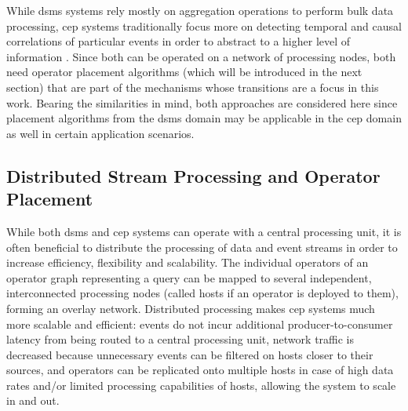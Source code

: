 While \gls{dsms} systems rely mostly on aggregation operations to perform bulk data processing, \gls{cep} systems traditionally focus more on detecting temporal and causal correlations of particular events in order to abstract to a higher level of information \cite{Cugola2012}. Since both can be operated on a network of processing nodes, both need operator placement algorithms (which will be introduced in the next section) that are part of the mechanisms whose transitions are a focus in this work. Bearing the similarities in mind, both approaches are considered here since placement algorithms from the \gls{dsms} domain may be applicable in the \gls{cep} domain as well in certain application scenarios.

\subsection{Distributed Stream Processing and Operator Placement}

While both \gls{dsms} and \gls{cep} systems can operate with a central processing unit, it is often beneficial to distribute the processing of data and event streams in order to increase efficiency, flexibility and scalability.   
The individual operators of an operator graph representing a query can be mapped to several independent, interconnected processing nodes (called hosts if an operator is deployed to them), forming an overlay network. Distributed processing makes \gls{cep} systems much more scalable and efficient: events do not incur additional producer-to-consumer latency from being routed to a central processing unit, network traffic is decreased because unnecessary events can be filtered on hosts closer to their sources, and operators can be replicated onto multiple hosts in case of high data rates and/or limited processing capabilities of hosts, allowing the system to scale in and out.

